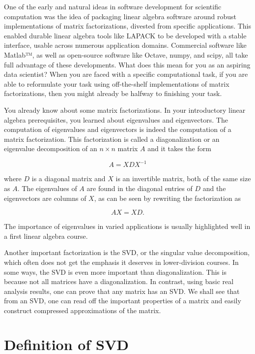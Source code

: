 \documentclass{ximera}
\begin{document}
\begin{problem}
\begin{problem}
One of the early and natural ideas in software development for scientific computation was the idea of packaging linear algebra software around robust implementations of matrix factorizations, divested from specific applications. This enabled durable linear algebra tools like LAPACK to be developed with a stable interface, usable across numerous application domains. Commercial software like Matlab™, as well as open-source software like Octave, numpy, and scipy, all take full advantage of these developments. What does this mean for you as an aspiring data scientist? When you are faced with a specific computational task, if you are able to reformulate your task using off-the-shelf implementations of matrix factorizations, then you might already be halfway to finishing your task.

You already know about some matrix factorizations. In your introductory linear algebra prerequisites, you learned about eigenvalues and eigenvectors. The computation of eigenvalues and eigenvectors is indeed the computation of a matrix factorization. This factorization is called a diagonalization or an eigenvalue decomposition of an \( n \times n \) matrix \( A \) and it takes the form

\[
A = X D X^{-1}
\]

where \( D \) is a diagonal matrix and \( X \) is an invertible matrix, both of the same size as \( A \). The eigenvalues of \( A \) are found in the diagonal entries of \( D \) and the eigenvectors are columns of \( X \), as can be seen by rewriting the factorization as

\[
A X = X D.
\]

The importance of eigenvalues in varied applications is usually highlighted well in a first linear algebra course.

Another important factorization is the SVD, or the singular value decomposition, which often does not get the emphasis it deserves in lower-division courses. In some ways, the SVD is even more important than diagonalization. This is because not all matrices have a diagonalization. In contrast, using basic real analysis results, one can prove that any matrix has an SVD. We shall see that from an SVD, one can read off the important properties of a matrix and easily construct compressed approximations of the matrix.

\section{Definition of SVD}


\end{problem}
\end{problem}
\end{document}
